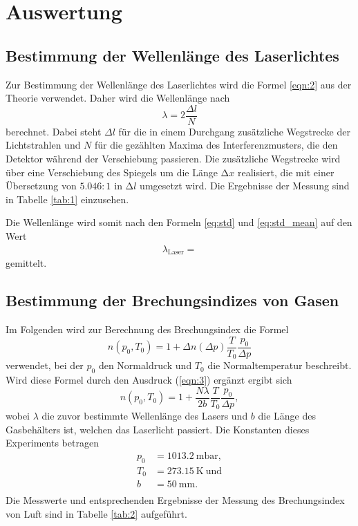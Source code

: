 \section{Auswertung}
\label{sec:Auswertung}

\subsection{Bestimmung der Wellenlänge des Laserlichtes}

Zur Bestimmung der Wellenlänge des Laserlichtes wird die Formel \ref{eqn:2} aus der Theorie verwendet.
Daher wird die Wellenlänge nach
\begin{equation}
  \lambda = 2\frac{\Delta l}{N}
\end{equation}
berechnet.
Dabei steht $\Delta l$ für die in einem Durchgang zusätzliche Wegstrecke der Lichtstrahlen und $N$ für die gezählten Maxima des Interferenzmusters, die den Detektor während der Verschiebung passieren.
Die zusätzliche Wegstrecke wird über eine Verschiebung des Spiegels um die Länge $\increment{x}$ realisiert, die mit einer Übersetzung von $5.046:1$ in $\increment{l}$ umgesetzt wird.
Die Ergebnisse der Messung sind in Tabelle \ref{tab:1} einzusehen.



Die Wellenlänge wird somit nach den Formeln \eqref{eq:std} und \eqref{eq:std_mean} auf den Wert
\begin{align*}
  \lambda_{\text{Laser}} = 
\end{align*}
gemittelt.

\subsection{Bestimmung der Brechungsindizes von Gasen}

Im Folgenden wird zur Berechnung des Brechungsindex die Formel
\begin{equation}
  n(p_0,T_0) = 1 +\Delta n(\Delta p) \frac{T}{T_0}\frac{p_0}{\Delta p}
\end{equation}
verwendet, bei der $p_0$ den Normaldruck und $T_0$ die Normaltemperatur beschreibt.
Wird diese Formel durch den Ausdruck (\ref{eqn:3}) ergänzt ergibt sich
\begin{equation}
  n(p_0,T_0) = 1 +\frac{N \lambda}{2b} \frac{T}{T_0}\frac{p_0}{\Delta p},
\end{equation}
wobei $\lambda$ die zuvor bestimmte Wellenlänge des Lasers und $b$ die Länge des Gasbehälters ist, welchen das Laserlicht passiert.
Die Konstanten dieses Experiments betragen
\begin{align*}
  p_0 &= \SI{1013,2}{\milli\bar},\\
  T_0 &= \SI{273,15}{\kelvin} \: \text{und}\\
  b   &= \SI{50}{\milli\metre}.\\
\end{align*}
Die Messwerte und entsprechenden Ergebnisse der Messung des Brechungsindex von Luft sind in Tabelle \ref{tab:2} aufgeführt.

